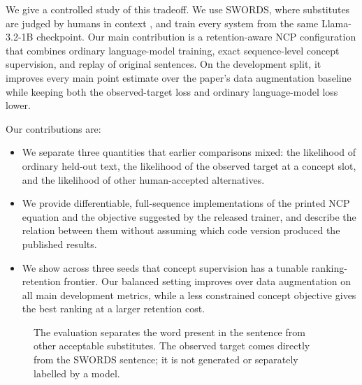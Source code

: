 \documentclass[11pt]{article}
\begin{document}
We give a controlled study of this tradeoff. We use SWORDS, where substitutes
are judged by humans in context \citep{lee2021swords}, and train every system from
the same Llama-3.2-1B checkpoint. Our main contribution is a retention-aware NCP
configuration that combines ordinary language-model training, exact
sequence-level concept supervision, and replay of original sentences. On the
development split, it improves every main point estimate over the paper's data
augmentation baseline while keeping both the observed-target loss and ordinary
language-model loss lower.

Our contributions are:
\begin{itemize}
    \item We separate three quantities that earlier comparisons mixed: the
    likelihood of ordinary held-out text, the likelihood of the observed target
    at a concept slot, and the likelihood of other human-accepted alternatives.
    \item We provide differentiable, full-sequence implementations of the
    printed NCP equation and the objective suggested by the released trainer,
    and describe the relation between them without assuming which code version
    produced the published results.
    \item We show across three seeds that concept supervision has a tunable
    ranking-retention frontier. Our balanced setting improves over data
    augmentation on all main development metrics, while a less constrained
    concept objective gives the best ranking at a larger retention cost.
\end{itemize}

\begin{figure}[t]
\centering
{}
\caption{The evaluation separates the word present in the sentence from other
acceptable substitutes. The observed target comes directly from the SWORDS
sentence; it is not generated or separately labelled by a model.}
\label{fig:task}
\end{figure}
\end{document}
